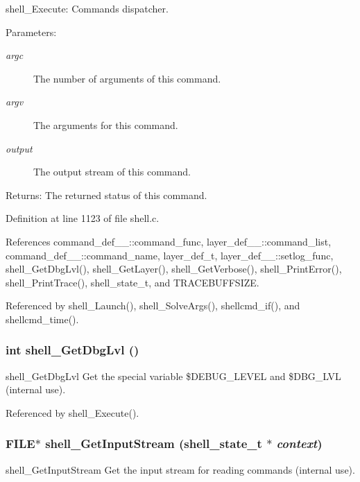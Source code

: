 shell\_\-Execute: Commands dispatcher.

\begin{Desc}
\item[Parameters:]
\begin{description}
\item[{\em argc}]The number of arguments of this command. \item[{\em argv}]The arguments for this command. \item[{\em output}]The output stream of this command.\end{description}
\end{Desc}
\begin{Desc}
\item[Returns:]The returned status of this command. \end{Desc}


Definition at line 1123 of file shell.c.

References command\_\-def\_\-\_\-::command\_\-func, layer\_\-def\_\-\_\-::command\_\-list, command\_\-def\_\-\_\-::command\_\-name, layer\_\-def\_\-t, layer\_\-def\_\-\_\-::setlog\_\-func, shell\_\-Get\-Dbg\-Lvl(), shell\_\-Get\-Layer(), shell\_\-Get\-Verbose(), shell\_\-Print\-Error(), shell\_\-Print\-Trace(), shell\_\-state\_\-t, and TRACEBUFFSIZE.

Referenced by shell\_\-Launch(), shell\_\-Solve\-Args(), shellcmd\_\-if(), and shellcmd\_\-time().
\subsubsection{\setlength{\rightskip}{0pt plus 5cm}int shell\_\-Get\-Dbg\-Lvl ()}\label{shell_8h_a24}


shell\_\-Get\-Dbg\-Lvl Get the special variable \$DEBUG\_\-LEVEL and \$DBG\_\-LVL (internal use). 

Referenced by shell\_\-Execute().
\subsubsection{\setlength{\rightskip}{0pt plus 5cm}FILE$\ast$ shell\_\-Get\-Input\-Stream ({\bf shell\_\-state\_\-t} $\ast$ {\em context})}\label{shell_8h_a25}


shell\_\-Get\-Input\-Stream Get the input stream for reading commands (internal use). 


